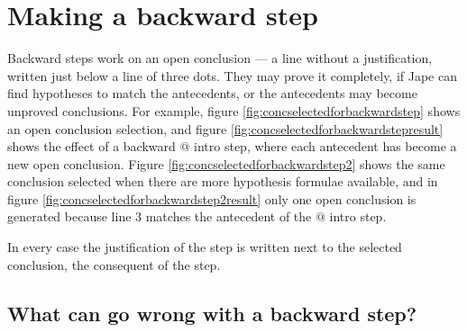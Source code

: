 \documentclass[11pt]{book}
\newcommand{\figref}[1]{figure \ref{fig:#1}}
\newcommand{\Figref}[1]{Figure \ref{fig:#1}}
\begin{document}
\section{Making a backward step}

Backward steps work on an open conclusion --- a line without a justification, written just below a line of three dots. They may prove it completely, if Jape can find hypotheses to match the antecedents, or the antecedents may become unproved conclusions. For example, \figref{concselectedforbackwardstep} shows an open conclusion selection, and \figref{concselectedforbackwardstepresult} shows the effect of a backward $@$ intro step, where each antecedent has become a new open conclusion. \Figref{concselectedforbackwardstep2} shows the same conclusion selected when there are more hypothesis formulae available, and in \figref{concselectedforbackwardstep2result} only one open conclusion is generated because line 3 matches the antecedent of the $@$ intro step.

In every case the justification of the step is written next to the selected conclusion, the consequent of the step.

\subsection{What can go wrong with a backward step?}
\end{document}
